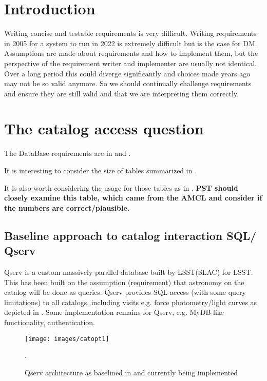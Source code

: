 \section{Introduction} \label{sec:intro}
 Writing concise and testable requirements is very difficult.
 Writing requirements in 2005 for a system to run in 2022 is extremely difficult but is the case for DM.
Assumptions are made about requirements and how to implement them, but
the perspective of the requirement writer and implementer are usually not identical.
Over a long period this could diverge significantly and  choices made years ago may not be so valid anymore.
So we should continually challenge requirements and ensure they are still valid and that we are interpreting them correctly.


\section{The catalog access question}\label{sec:cat}
The DataBase requirements are in  and .

It is interesting to consider the size of tables summarized in .


It is also worth considering the usage for those tables as in . {\bf PST should closely examine this table, which came from the AMCL and consider if the numbers are correct/plausible.}

\subsection{Baseline approach to catalog interaction SQL/ Qserv}
\label{sec:qserv}
Qserv is a custom massively parallel database built by LSST(SLAC) for LSST.
This has been built on the assumption (requirement) that astronomy on the catalog will be done as queries.
Qserv provides SQL access (with some query limitations) to all catalogs, including visits e.g. force photometry/light curves as depicted in .
Some implementation remains for Qserv, e.g. MyDB-like functionality, authentication.

\begin{figure}
\begin{center}
 \texttt{[image: images/catopt1]}
\caption{Qserv architecture as baselined in  and currently being implemented \label{fig:catopt1}}.
\end{center}
\end{figure}


